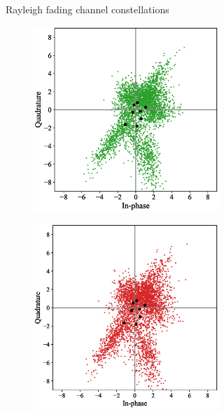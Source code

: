 \begin{figure}[tp!]
\begin{subfigure}{0.325\linewidth}
\begin{subfigure}{0.48\textwidth}
		\end{subfigure}
		\caption{Rayleigh fading channel constellations}
		\label{fig:rayleigh_constellation}
	\end{subfigure}
	\begin{subfigure}{0.325\linewidth}
		\begin{subfigure}{0.48\textwidth}
			\includegraphics[width=\linewidth]{figs/rician_normal_constellation}
		\end{subfigure}
		\hfill
		\begin{subfigure}{0.48\textwidth}
			\includegraphics[width=\linewidth]{figs/rician_covert_constellation}

\end{subfigure}
\end{subfigure}
\end{figure}
